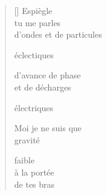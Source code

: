 \documentclass[11pt,a4paper]{article}
\begin{document}
\thispagestyle{empty}


\settowidth{\versewidth}{d'onde et de particules}

\bigskip

\begin{verse}[\versewidth]
  Espiègle \\
  tu me parles \\
  d'ondes et de particules

  éclectiques

  d'avance de phase \\
  et de décharges

  électriques

  Moi je ne suis que \\
  gravité

  faible \\
  à la portée \\
  de tes bras
\end{verse}
\end{document}
